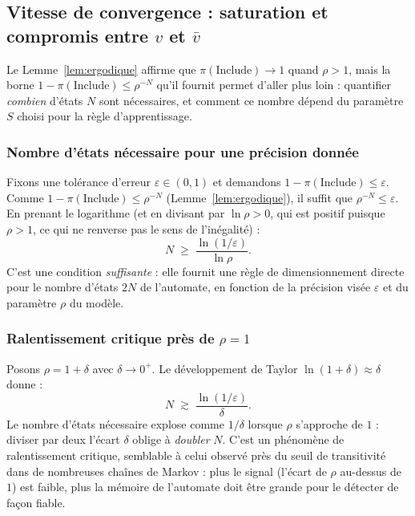 \documentclass[12pt,a4paper]{article}
\theoremstyle{remark}
\newcommand{\Inc}{\ensuremath{\mathrm{Include}}}
\newcommand{\vbar}{\bar{v}}
\begin{document}
\subsection{Vitesse de convergence : saturation et compromis entre $v$ et $\vbar$}\label{sec:vitesse_convergence}

Le Lemme~\ref{lem:ergodique} affirme que $\pi(\Inc)\to1$ quand $\rho>1$, mais la borne
$1-\pi(\Inc)\le\rho^{-N}$ qu'il fournit permet d'aller plus loin : quantifier
\emph{combien} d'états $N$ sont nécessaires, et comment ce nombre dépend du paramètre
$S$ choisi pour la règle d'apprentissage.

\subsubsection*{Nombre d'états nécessaire pour une précision donnée}

Fixons une tolérance d'erreur $\varepsilon \in (0,1)$ et demandons $1-\pi(\Inc)\le\varepsilon$.
Comme $1-\pi(\Inc)\le\rho^{-N}$ (Lemme~\ref{lem:ergodique}), il suffit que $\rho^{-N}\le\varepsilon$.
En prenant le logarithme (et en divisant par $\ln\rho>0$, qui est positif puisque $\rho>1$,
ce qui ne renverse pas le sens de l'inégalité) :
\[
  \boxed{N \;\ge\; \frac{\ln(1/\varepsilon)}{\ln\rho}.}
\]
C'est une condition \emph{suffisante} : elle fournit une règle de dimensionnement
directe pour le nombre d'états $2N$ de l'automate, en fonction de la précision visée
$\varepsilon$ et du paramètre $\rho$ du modèle.

\subsubsection*{Ralentissement critique près de $\rho = 1$}

Posons $\rho = 1+\delta$ avec $\delta \to 0^+$. Le développement de Taylor
$\ln(1+\delta) \approx \delta$ donne :
\[
  N \;\gtrsim\; \frac{\ln(1/\varepsilon)}{\delta}.
\]
Le nombre d'états nécessaire explose comme $1/\delta$ lorsque $\rho$ s'approche de $1$ :
diviser par deux l'écart $\delta$ oblige à \emph{doubler} $N$. C'est un phénomène de
ralentissement critique, semblable à celui observé près du seuil de transitivité dans
de nombreuses chaînes de Markov : plus le signal (l'écart de $\rho$ au-dessus de $1$)
est faible, plus la mémoire de l'automate doit être grande pour le détecter de façon
fiable.
\end{document}
